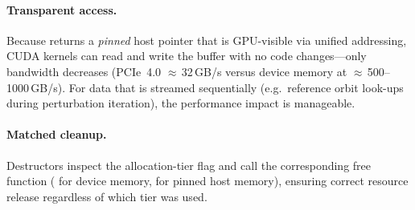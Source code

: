 \paragraph{Transparent access.}
Because  returns a \emph{pinned} host pointer
that is GPU-visible via unified addressing, CUDA kernels can read
and write the buffer with no code changes---only bandwidth
decreases (PCIe~4.0 $\approx$\,32\,GB/s versus device memory at
$\approx$\,500--1000\,GB/s).  For data that is streamed
sequentially (e.g.\ reference orbit look-ups during perturbation
iteration), the performance impact is manageable.

\paragraph{Matched cleanup.}
Destructors inspect the allocation-tier flag and call the
corresponding free function ( for device memory,
 for pinned host memory), ensuring correct
resource release regardless of which tier was used.

